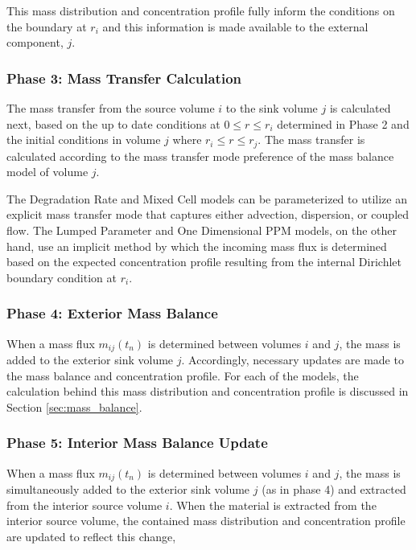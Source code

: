 This mass distribution and concentration profile fully inform 
the conditions on the boundary at $r_i$ and this information is made available 
to the external component, $j$.


\subsubsection{Phase 3: Mass Transfer Calculation}

The mass transfer from the source volume $i$ to the sink volume $j$ is 
calculated next, based on the up to date conditions at $0\le r \le r_{i}$ 
determined in Phase 2 and the initial conditions in volume $j$ where $r_i \le r 
\le r_j$. The mass transfer is calculated according to the mass transfer mode 
preference of the mass balance model of volume $j$.  

The Degradation Rate and Mixed Cell models can be parameterized to utilize an 
explicit mass transfer mode that captures either advection, dispersion, or 
coupled flow.  The Lumped Parameter and One Dimensional PPM models, on the 
other hand, use an implicit method by which the incoming mass flux is determined 
based on the expected concentration profile resulting from the internal 
Dirichlet boundary condition at $r_i$. 

\subsubsection{Phase 4: Exterior Mass Balance}

When a mass flux $m_{ij}(t_n)$ is determined between volumes $i$ and $j$, the 
mass is added to the exterior sink volume $j$. Accordingly, necessary updates 
are made to the mass balance and concentration profile.  For each of the 
models, the calculation behind this mass distribution and concentration profile 
is discussed in Section \ref{sec:mass_balance}.

\subsubsection{Phase 5: Interior Mass Balance Update}

When a mass flux $m_{ij}(t_n)$ is determined between volumes $i$ and $j$, the 
mass is simultaneously added to the exterior sink volume $j$ (as in phase 4) and 
extracted from the interior source volume $i$.  When the material is extracted 
from the interior source volume, the contained mass distribution and 
concentration profile are updated to reflect this change,


